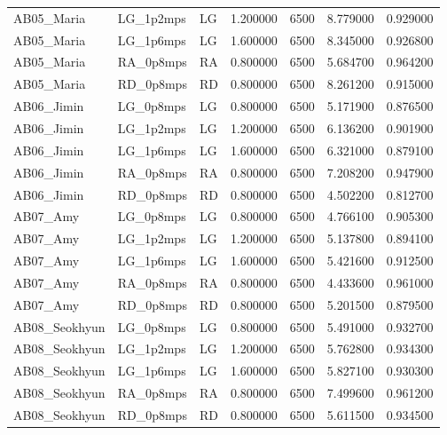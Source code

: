 \begin{table}
\begin{tabular}{lllrrrr}
AB05\_Maria & LG\_1p2mps & LG & 1.200000 & 6500 & 8.779000 & 0.929000 \\
AB05\_Maria & LG\_1p6mps & LG & 1.600000 & 6500 & 8.345000 & 0.926800 \\
AB05\_Maria & RA\_0p8mps & RA & 0.800000 & 6500 & 5.684700 & 0.964200 \\
AB05\_Maria & RD\_0p8mps & RD & 0.800000 & 6500 & 8.261200 & 0.915000 \\
AB06\_Jimin & LG\_0p8mps & LG & 0.800000 & 6500 & 5.171900 & 0.876500 \\
AB06\_Jimin & LG\_1p2mps & LG & 1.200000 & 6500 & 6.136200 & 0.901900 \\
AB06\_Jimin & LG\_1p6mps & LG & 1.600000 & 6500 & 6.321000 & 0.879100 \\
AB06\_Jimin & RA\_0p8mps & RA & 0.800000 & 6500 & 7.208200 & 0.947900 \\
AB06\_Jimin & RD\_0p8mps & RD & 0.800000 & 6500 & 4.502200 & 0.812700 \\
AB07\_Amy & LG\_0p8mps & LG & 0.800000 & 6500 & 4.766100 & 0.905300 \\
AB07\_Amy & LG\_1p2mps & LG & 1.200000 & 6500 & 5.137800 & 0.894100 \\
AB07\_Amy & LG\_1p6mps & LG & 1.600000 & 6500 & 5.421600 & 0.912500 \\
AB07\_Amy & RA\_0p8mps & RA & 0.800000 & 6500 & 4.433600 & 0.961000 \\
AB07\_Amy & RD\_0p8mps & RD & 0.800000 & 6500 & 5.201500 & 0.879500 \\
AB08\_Seokhyun & LG\_0p8mps & LG & 0.800000 & 6500 & 5.491000 & 0.932700 \\
AB08\_Seokhyun & LG\_1p2mps & LG & 1.200000 & 6500 & 5.762800 & 0.934300 \\
AB08\_Seokhyun & LG\_1p6mps & LG & 1.600000 & 6500 & 5.827100 & 0.930300 \\
AB08\_Seokhyun & RA\_0p8mps & RA & 0.800000 & 6500 & 7.499600 & 0.961200 \\
AB08\_Seokhyun & RD\_0p8mps & RD & 0.800000 & 6500 & 5.611500 & 0.934500 \\
\bottomrule
\end{tabular}
\end{table}
